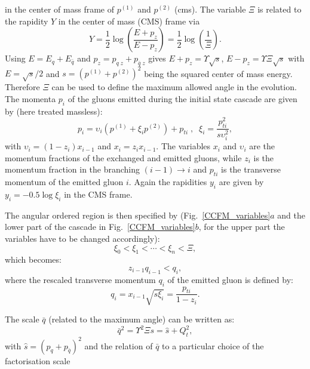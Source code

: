 \documentclass[11pt]{article} \usepackage{mystyle-new}
\newcommand{\Pmax}{\bar{q}}
\def\prp{t}
\def\pti#1{\ensuremath{p_{\prp #1}}}
\begin{document}
in the center of mass frame of
$p^{(1)}$ and $p^{(2)}$ (cms).
The variable $\Xi$ is related to the rapidity $Y$ 
in the center of mass (CMS) frame via 
\begin{equation}
Y = \frac{1}{2} \log \left(\frac{E+p_z}{E-p_z}\right)  
= \frac{1}{2}  \log \left(\frac{1}{\Xi}\right)  .
\end{equation}
Using $E=E_q+E_{\bar{q}}$ and $p_z = p_{q\;z} + p_{\bar{q}\;z}$ gives 
   $E+p_z= \Upsilon \sqrt{s}$, $E-p_z= \Upsilon \Xi\sqrt{s}$ with
$E=\sqrt{s}/2$ and 
$s=(p^{(1)}+p^{(2)})^2$ being the squared center of mass energy.
 Therefore $\Xi$ can be used to define the maximum allowed angle 
in the evolution.
The momenta $p_i$ of the gluons emitted during the initial
state cascade are given by (here treated massless):
\begin{equation}
p_i = \upsilon_i (p^{(1)} + \xi_i p^{(2)}) + \pti{i} \;  , \;\; 
\xi_i=\frac{p_{ti}^2}{s \upsilon_i^2},
\end{equation}
with $\upsilon_i = (1 - z_i) x_{i-1}$ and $x_i = z_i x_{i-1}$. 
The variables 
 $x_i$ and $\upsilon_i$ are the
momentum fractions of the exchanged and emitted gluons, while $z_i$ is
the momentum fraction in the branching $(i-1) \to i$ and $\pti{i}$ is
the transverse momentum of the emitted gluon $i$. 
Again the rapidities $y_i$ are given by $y_i = - 0.5 \log \xi_i $ in the CMS frame. 
\par
The angular ordered region is then specified by 
(Fig.~\ref{CCFM_variables}$a$ and the lower part of the
cascade in Fig.~\ref{CCFM_variables}$b$, for the upper part  the variables
have to be changed accordingly):
\begin{equation}
\xi_0 < \xi_1< \cdots < \xi_n < \Xi ,
\end{equation}
which becomes:
\begin{equation}
z_{i-1} q_{i-1} < q_{i}  ,
\end{equation}
where the rescaled transverse momentum $q_{i}$ of the emitted
gluon is defined by:
\begin{equation}
 q_{i} = x_{i-1}\sqrt{s \xi_i} = \frac{\pti{i}}{1-z_i} .
 \label{qbar}
\end{equation}
\par 
The scale $\Pmax$ (related to the maximum angle) 
can be written as:
\begin{equation}
 \Pmax^2 = \Upsilon^2 \Xi s 
 = \hat{s} + Q_{\prp}^2  ,
\end{equation}
with $\hat{s}=(p_q + p_{\bar{q}})^2$ and the relation of $\Pmax$
to a particular choice of the factorisation scale 
\end{document}
